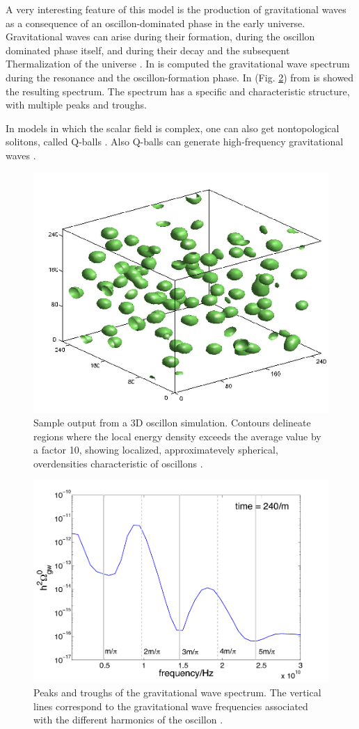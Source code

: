 \documentclass[11pt,a4paper,twoside]{book}
\begin{document}
A very interesting feature of this model is the production of gravitational waves as a consequence of an oscillon-dominated phase in the early universe. Gravitational waves can arise during their formation, during the oscillon dominated phase  itself, and during their decay and the subsequent Thermalization of the universe \cite{Chap5:GWFromOscillon}. In \cite{Chap5:GWFromOscillon} is computed the gravitational wave spectrum during the resonance and the oscillon-formation phase. In (Fig. \ref{fig:oscillonsfig2}) from \cite{Chap5:GWFromOscillon} is showed the resulting spectrum. The spectrum has a specific and characteristic structure, with multiple peaks and troughs.

In models in which the scalar field is complex, one can also get nontopological solitons, called Q-balls \cite{Chap5:QBall}. Also Q-balls can generate high-frequency gravitational waves \cite{Chap5:QBallGWS}.
\begin{figure}
	\centering
	\includegraphics[width=0.6\linewidth, height=0.35\textheight]{Images/Chap5/Oscillons_Fig1}
	\caption{Sample output from a 3D oscillon simulation. Contours delineate regions where the local energy density exceeds the average value by a factor 10, showing localized, approximatevely spherical, overdensities characteristic of oscillons \cite{Chap5:Oscillon_OscillonFormationInThreeDimension}.}
	\label{fig:oscillonsfig1}
\end{figure}
\begin{figure}
	\centering
	\includegraphics[width=0.6\linewidth, height=0.35\textheight]{Images/Chap5/Oscillons_Fig2}
	\caption{Peaks and troughs of the gravitational wave spectrum. The vertical lines correspond to the gravitational wave frequencies associated with the different harmonics of the oscillon \cite{Chap5:GWFromOscillon}.}
	\label{fig:oscillonsfig2}
\end{figure}
\end{document}
